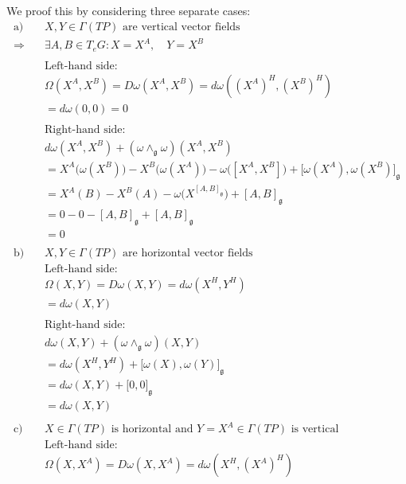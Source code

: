 We proof this by considering three separate cases\cite{FredericSchullerCurvaturetorsionprincipalbundlesLec24FredericSchuller2015}:
\begin{align*}
  \text{a)} \quad & X, Y \in \Gamma(TP) \text{ are vertical vector fields} \\
  \Rightarrow\quad & \exists A, B \in T_eG : X = X^A, \quad Y = X^B \\
  \\
  & \text{Left-hand side:} \\
  & \Omega(X^A, X^B) = D\omega(X^A, X^B) = d\omega\left( (X^A)^H, (X^B)^H \right) \\
  &= d\omega(0, 0) = 0 \\
  \\
  & \text{Right-hand side:} \\
  & d\omega(X^A, X^B) + (\omega \wedge_{\mathfrak{g}} \omega)(X^A, X^B) \\
  &= X^A \big( \omega(X^B) \big) - X^B \big( \omega(X^A) \big) - \omega\big( [X^A, X^B] \big) + \big[ \omega(X^A), \omega(X^B) \big]_{\mathfrak{g}} \\
  &= X^A (B) - X^B (A) - \omega\big( X^{[A,B]_\mathfrak{g}} \big) + [A,B]_{\mathfrak{g}} \\
  &= 0 - 0 - [A,B]_{\mathfrak{g}} + [A,B]_{\mathfrak{g}} \\
  &= 0 \\
  \\ 
  \text{b)} \quad & X, Y \in \Gamma(TP) \text{ are horizontal vector fields} \\
    & \text{Left-hand side:} \\
  & \Omega(X,Y) = D\omega(X,Y) = d\omega(X^H, Y^H) \\
  &= d\omega(X, Y) \\
  \\
  &\text{Right-hand side:} \\
  & d\omega(X,Y) + (\omega \wedge_{\mathfrak{g}} \omega)(X,Y) \\
  &= d\omega(X^H, Y^H) + \big[ \omega(X), \omega(Y) \big]_\mathfrak{g} \\
  &= d\omega(X,Y) + \big[ 0, 0 \big]_\mathfrak{g} \\
  &= d\omega(X,Y) \\
  \\
  \text{c)} \quad & X \in \Gamma(TP) \text{ is horizontal and } Y=X^A \in \Gamma(TP) \text{ is vertical} \\
      & \text{Left-hand side:} \\
  &\Omega(X,X^A) = D\omega(X,X^A) = d\omega(X^H, (X^A)^H) \\

\end{align*}
